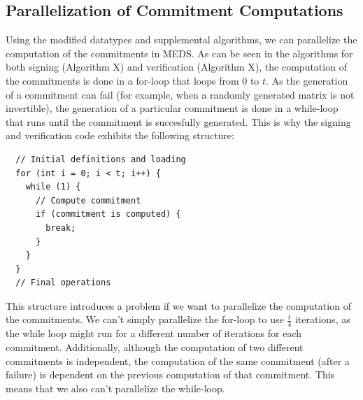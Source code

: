 \documentclass[11pt,a4paper]{report}
\theoremstyle{definition}
\begin{document}
\subsection{Parallelization of Commitment Computations}
\label{sec:commitmentparallelization}
Using the modified datatypes and supplemental algorithms, we can parallelize the computation of the commitments in MEDS. As can be seen in the algorithms for both signing (Algorithm X) and verification (Algorithm X), the computation of the commitments is done in a for-loop that loops from $0$ to $t$. As the generation of a commitment can fail (for example, when a randomly generated matrix is not invertible), the generation of a particular commitment is done in a while-loop that runs until the commitment is succesfully generated. This is why the signing and verification code exhibits the following structure:
\begin{verbatim}
  // Initial definitions and loading
  for (int i = 0; i < t; i++) {
    while (1) {
      // Compute commitment
      if (commitment is computed) {
        break;
      }
    }
  }
  // Final operations
\end{verbatim}
This structure introduces a problem if we want to parallelize the computation of the commitments. We can't simply parallelize the for-loop to use $\frac{t}{4}$ iterations, as the while loop might run for a different number of iterations for each commitment. Additionally, although the computation of two different commitments is independent, the computation of the same commitment (after a failure) is dependent on the previous computation of that commitment. This means that we also can't parallelize the while-loop.
\end{document}
